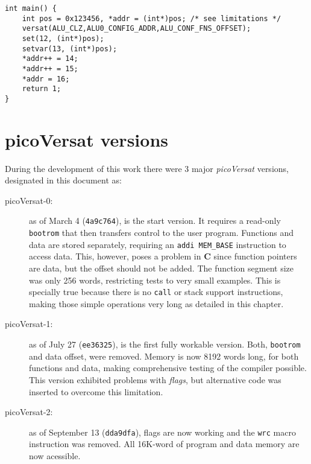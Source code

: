 \begin{Verbatim}[baselinestretch=1.2]
int main() {
    int pos = 0x123456, *addr = (int*)pos; /* see limitations */
    versat(ALU_CLZ,ALU0_CONFIG_ADDR,ALU_CONF_FNS_OFFSET);
    set(12, (int*)pos);
    setvar(13, (int*)pos);
    *addr++ = 14;
    *addr++ = 15;
    *addr = 16;
    return 1;
}
\end{Verbatim}

\section{picoVersat versions}

During the development of this work there were 3 major {\it picoVersat}
versions, designated in this document as:
\begin{description}
\item[picoVersat-0:] as of March 4 ({\tt 4a9c764}), is the start version.
	It requires a read-only {\tt bootrom} that then transfers control
	to the user program. Functions and data are stored separately,
	requiring an {\tt addi MEM\_BASE} instruction to access data.
	This, however, poses a problem in {\bf C} since function pointers
	are data, but the offset should not be added.
	The function segment size was only 256 words, restricting tests to
	very small examples. This is specially true because there is no
	{\tt call} or stack support instructions, making those simple
	operations very long as detailed in this chapter.
\item[picoVersat-1:] as of July 27 ({\tt ee36325}), is the first fully
	workable version.  Both, {\tt bootrom} and data offset, were removed.
	Memory is now 8192 words long, for both functions and data, making
	comprehensive testing of the compiler possible.
	This version exhibited problems with {\it flags}, but alternative
	code was inserted to overcome this limitation.
\item[picoVersat-2:] as of September 13 ({\tt dda9dfa}), flags are now
	working and the {\tt wrc} macro instruction was removed.
	All 16K-word of program and data memory are now acessible.
\end{description}


